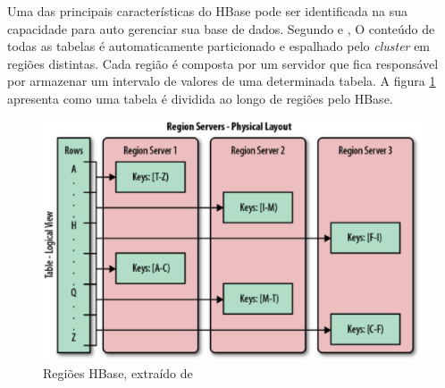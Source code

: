 Uma das principais características do HBase pode ser identificada na sua capacidade para auto gerenciar sua base de dados. Segundo  e , O conteúdo de todas as tabelas é automaticamente particionado e espalhado pelo \textit{cluster} em regiões distintas. Cada região é composta por um servidor que fica responsável por armazenar um intervalo de valores de uma determinada tabela. A figura \ref{fig-hbase-region} apresenta como uma tabela é dividida ao longo de regiões pelo HBase.

\begin{figure}[ht!]
	\centering
	\includegraphics[keepaspectratio=true,scale=0.5]
	  {figuras/hbase-region.eps}
	\caption{Regiões HBase, extraído de 
	}
	\label{fig-hbase-region}
\end{figure}
\FloatBarrier

